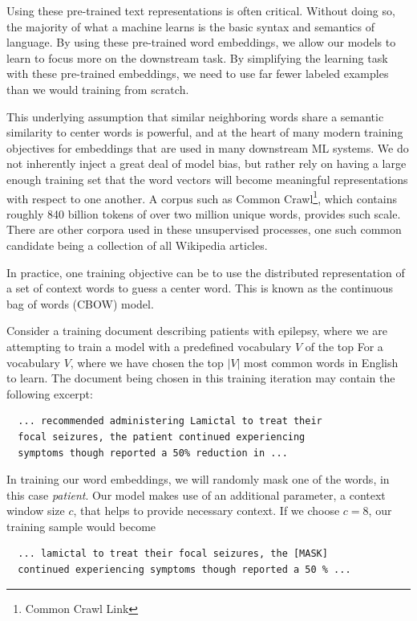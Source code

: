Using these pre-trained text representations is often critical. Without doing so, the majority of what a machine learns is the basic syntax and semantics of language. By using these pre-trained word embeddings, we allow our models to learn to focus more on the downstream task. By simplifying the learning task with these pre-trained embeddings, we need to use far fewer labeled examples than we would training from scratch.

This underlying assumption that similar neighboring words share a semantic similarity to center words is powerful, and at the heart of many modern training objectives for embeddings that are used in many downstream ML systems.
We do not inherently inject a great deal of model bias, but rather rely on having a large enough training set that the word vectors will become meaningful representations with respect to one another.
A corpus such as Common Crawl\footnote{Common Crawl Link}, which contains roughly 840 billion tokens of over two million unique words, provides such scale.
There are other corpora used in these unsupervised processes, one such common candidate being a collection of all Wikipedia articles.

In practice, one training objective can be to use the distributed representation of a set of context words to guess a center word. This is known as the continuous bag of words (CBOW) model.

Consider a training document describing patients with epilepsy, where we are attempting to train a model with a predefined vocabulary $V$ of the top For a vocabulary $V$, where we have chosen the top $|V|$ most common words in English to learn.
The document being chosen in this training iteration may contain the following excerpt:

\begin{verbatim}
  ... recommended administering Lamictal to treat their
  focal seizures, the patient continued experiencing
  symptoms though reported a 50% reduction in ...
\end{verbatim}

In training our word embeddings, we will randomly mask one of the words, in this case \textit{patient}.
Our model makes use of an additional parameter, a context window size $c$, that helps to provide necessary context.
If we choose $c = 8$, our training sample would become

\begin{verbatim}
  ... lamictal to treat their focal seizures, the [MASK]
  continued experiencing symptoms though reported a 50 % ...
  \end{verbatim}


